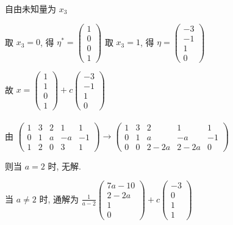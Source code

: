 \begin{enumerate}
			       自由未知量为 \( x_{3} \)

			       取 \( x_{3} = 0 \), 得 \( \eta^{*} = \begin{pmatrix}
				       1 \\
				       0 \\
				       0 \\
				       1
			       \end{pmatrix} \) 取 \( x_{3} = 1 \), 得 \( \eta = \begin{pmatrix}
				       -3 \\
				       -1 \\
				       1  \\
				       0
			       \end{pmatrix} \)

			       故 \( x = \begin{pmatrix}
				       1 \\
				       1 \\
				       0 \\
				       1
			       \end{pmatrix} + c\begin{pmatrix}
				       -3 \\
				       -1 \\
				       1  \\
				       0
			       \end{pmatrix} \)
		 \end{enumerate}


	 \paragraph{} %
		 由 \( \begin{pmatrix}
			 1 & 3 & 2 & 1  & 1  \\
			 0 & 1 & a & -a & -1 \\
			 1 & 2 & 0 & 3  & 1
		 \end{pmatrix} \rightarrow \begin{pmatrix}
			 1 & 3 & 2    & 1    & 1  \\
			 0 & 1 & a    & -a   & -1 \\
			 0 & 0 & 2-2a & 2-2a & 0
		 \end{pmatrix} \)

		 则当 \( a = 2 \) 时, 无解.

		 当 \( a \neq 2 \) 时, 通解为 \( \frac{1}{a-2}\begin{pmatrix}
			 7a-10 \\
			 2-2a  \\
			 1     \\
			 0
		 \end{pmatrix} + c\begin{pmatrix}
			 -3 \\
			 0  \\
			 1  \\
			 1
		 \end{pmatrix} \)


